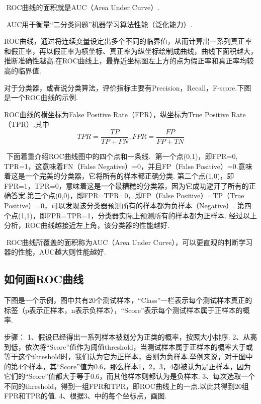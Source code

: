​ ROC曲线的面积就是AUC（Area Under Curve）.

​ AUC用于衡量``二分类问题''机器学习算法性能（泛化能力）.

​
ROC曲线，通过将连续变量设定出多个不同的临界值，从而计算出一系列真正率和假正率，再以假正率为横坐标、真正率为纵坐标绘制成曲线，曲线下面积越大，推断准确性越高.在ROC曲线上，最靠近坐标图左上方的点为假正率和真正率均较高的临界值.

​
对于分类器，或者说分类算法，评价指标主要有Precision，Recall，F-score.下图是一个ROC曲线的示例.


ROC曲线的横坐标为False Positive Rate（FPR），纵坐标为True Positive
Rate（TPR）.其中 \[
TPR = \frac{TP}{TP+FN} ,FPR = \frac{FP}{FP+TN}
\]

​ 下面着重介绍ROC曲线图中的四个点和一条线. ​ 第一个点(0,1)，即FPR=0,
TPR=1，这意味着FN（False Negative）=0，并且FP（False
Positive）=0.意味着这是一个完美的分类器，它将所有的样本都正确分类. ​
第二个点(1,0)，即FPR=1，TPR=0，意味着这是一个最糟糕的分类器，因为它成功避开了所有的正确答案.
​ 第三个点(0,0)，即FPR=TPR=0，即FP（False Positive）=TP（True
Positive）=0，可以发现该分类器预测所有的样本都为负样本（Negative）. ​
第四个点(1,1)，即FPR=TPR=1，分类器实际上预测所有的样本都为正样本. ​
经过以上分析，ROC曲线越接近左上角，该分类器的性能越好.

​ ROC曲线所覆盖的面积称为AUC（Area Under
Curve），可以更直观的判断学习器的性能，AUC越大则性能越好.

\subsection{如何画ROC曲线}\label{ux5982ux4f55ux753brocux66f2ux7ebf}

​
下图是一个示例，图中共有20个测试样本，``Class''一栏表示每个测试样本真正的标签（p表示正样本，n表示负样本），``Score''表示每个测试样本属于正样本的概率.

步骤： 1、假设已经得出一系列样本被划分为正类的概率，按照大小排序.
2、从高到低，依次将``Score''值作为阈值threshold，当测试样本属于正样本的概率大于或等于这个threshold时，我们认为它为正样本，否则为负样本.举例来说，对于图中的第4个样本，其``Score''值为0.6，那么样本1，2，3，4都被认为是正样本，因为它们的``Score''值都大于等于0.6，而其他样本则都认为是负样本.
3、每次选取一个不同的threshold，得到一组FPR和TPR，即ROC曲线上的一点.以此共得到20组FPR和TPR的值.
4、根据3、中的每个坐标点，画图.

